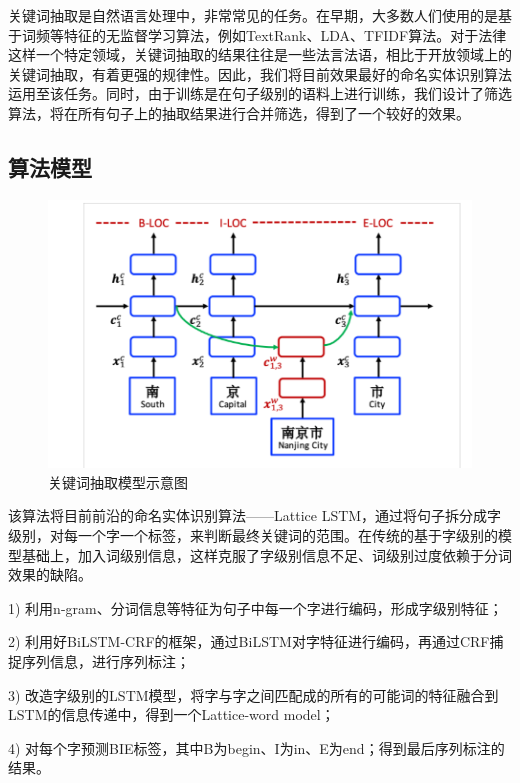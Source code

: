 关键词抽取是自然语言处理中，非常常见的任务。在早期，大多数人们使用的是基于词频等特征的无监督学习算法，例如TextRank、LDA、TFIDF算法。对于法律这样一个特定领域，关键词抽取的结果往往是一些法言法语，相比于开放领域上的关键词抽取，有着更强的规律性。因此，我们将目前效果最好的命名实体识别算法运用至该任务。同时，由于训练是在句子级别的语料上进行训练，我们设计了筛选算法，将在所有句子上的抽取结果进行合并筛选，得到了一个较好的效果。

\subsection{算法模型}

\begin{figure}[ht]
    \centering
    \includegraphics[width=\linewidth]{figures/model2}
    \caption{关键词抽取模型示意图}
    \label{fig:model2}
\end{figure}

该算法将目前前沿的命名实体识别算法——Lattice LSTM，通过将句子拆分成字级别，对每一个字一个标签，来判断最终关键词的范围。在传统的基于字级别的模型基础上，加入词级别信息，这样克服了字级别信息不足、词级别过度依赖于分词效果的缺陷。

1)	利用n-gram、分词信息等特征为句子中每一个字进行编码，形成字级别特征；

2)	利用好BiLSTM-CRF的框架，通过BiLSTM对字特征进行编码，再通过CRF捕捉序列信息，进行序列标注；

3)	改造字级别的LSTM模型，将字与字之间匹配成的所有的可能词的特征融合到LSTM的信息传递中，得到一个Lattice-word model；

4)	对每个字预测BIE标签，其中B为begin、I为in、E为end；得到最后序列标注的结果。



